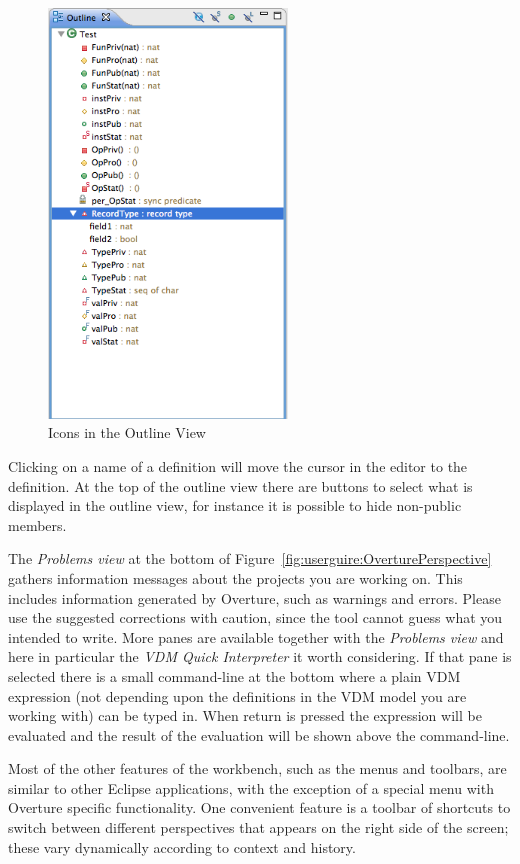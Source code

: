 \documentclass{overturerepchap}
\begin{document}
\begin{figure}[!htb]
\begin{center}
  \includegraphics[width=2.5in]{figures/OutlineIcons}
  \caption[labelInTOC]{Icons in the Outline View}
  \label{fig:OutlineIcons}
\end{center}
\end{figure}

Clicking on a name of a definition will move the cursor in
the editor to the definition. At the top of the outline view there
are buttons to select what is displayed in the outline view, for
instance it is possible to hide non-public members.

The \emph{Problems view} at the bottom of 
Figure~\ref{fig:userguire:OverturePerspective} gathers 
information messages about the projects you are
working on. This includes information generated by Overture, such as
warnings and errors. Please use the suggested corrections with caution,
since the tool cannot guess what you intended to write. More panes are
available together with the \emph{Problems view} and here in
particular the \emph{VDM Quick Interpreter}
it worth considering. If that pane is selected there is a small
command-line at the bottom where a plain VDM expression (not depending
upon the definitions in the VDM model you are working with) can be
typed in. When return is pressed the expression will be evaluated and
the result of the evaluation will be shown above the command-line.

Most of the other features of the workbench, such as the menus and
toolbars, are similar to other Eclipse applications, with the exception 
of a special menu with Overture specific functionality. One
convenient feature is a toolbar of shortcuts to switch between
different perspectives that appears on the right side of the screen;
these vary dynamically according to context and history.
\end{document}
